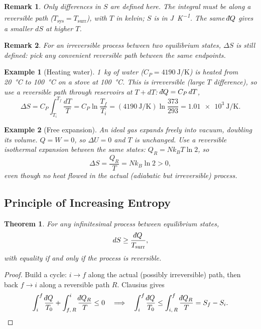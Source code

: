 \documentclass{article}
\newtheorem{theorem}{Theorem}
\newtheorem*{example}{Example}
\newtheorem{remark}{Remark}
\newcommand{\dbar}{\mathchar'26\mkern-12mu d}
\begin{document}
\begin{remark}
    Only differences in $S$ are defined here. The integral must be along a reversible path ($T_{\text{sys}} = T_{\text{surr}}$), with $T$ in kelvin; $S$ is in \si{\joule\per\kelvin}. The same $\dbar Q$ gives a smaller $dS$ at higher $T$.
\end{remark}

\begin{remark}
    For an irreversible process between two equilibrium states, $\Delta S$ is still defined: pick any convenient reversible path between the same endpoints.
\end{remark}

\begin{example}[Heating water]
    \SI{1}{\kilo\gram} of water ($C_P = \SI{4190}{\joule\per\kelvin}$) is heated from \SI{20}{\celsius} to \SI{100}{\celsius} on a stove at \SI{100}{\celsius}. This is irreversible (large $T$ difference), so use a reversible path through reservoirs at $T + dT$: $\dbar Q = C_P\,dT$,
    \[\Delta S = C_P \int_{T_i}^{T_f} \frac{dT}{T} = C_P \ln\frac{T_f}{T_i} = (\SI{4190}{\joule\per\kelvin}) \ln\frac{373}{293} = \SI{1.01e3}{\joule\per\kelvin}.\]
\end{example}

\begin{example}[Free expansion]
    An ideal gas expands freely into vacuum, doubling its volume. $Q = W = 0$, so $\Delta U = 0$ and $T$ is unchanged. Use a reversible isothermal expansion between the same states: $Q_R = Nk_BT\ln 2$, so
    \[\Delta S = \frac{Q_R}{T} = Nk_B \ln 2 > 0,\]
    even though no heat flowed in the actual (adiabatic but irreversible) process.
\end{example}

\subsection{Principle of Increasing Entropy}
\begin{theorem}
    For any infinitesimal process between equilibrium states,
    \[dS \geq \frac{\dbar Q}{T_{\text{surr}}},\]
    with equality if and only if the process is reversible.
\end{theorem}
\begin{proof}
    Build a cycle: $i \to f$ along the actual (possibly irreversible) path, then back $f \to i$ along a reversible path $R$. Clausius gives
    \[\int_i^f \frac{\dbar Q}{T_0} + \int_{f,\,R}^{i} \frac{\dbar Q_R}{T} \leq 0 \quad\Longrightarrow\quad \int_i^f \frac{\dbar Q}{T_0} \leq \int_{i,\,R}^{f} \frac{\dbar Q_R}{T} = S_f - S_i.\]
\end{proof}
\end{document}

